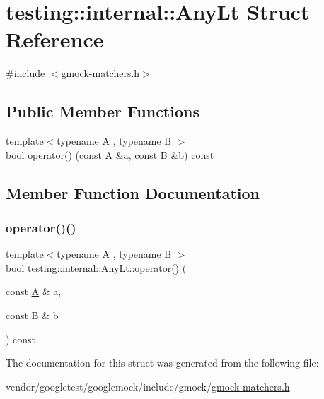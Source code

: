 \hypertarget{structtesting_1_1internal_1_1_any_lt}{}\section{testing\+:\+:internal\+:\+:Any\+Lt Struct Reference}
\label{structtesting_1_1internal_1_1_any_lt}


{\ttfamily \#include $<$gmock-\/matchers.\+h$>$}

\subsection*{Public Member Functions}
\begin{DoxyCompactItemize}
\item 
{\footnotesize template$<$typename A , typename B $>$ }\\bool \hyperlink{structtesting_1_1internal_1_1_any_lt_ac7be54cdf8fd18e12fda49d886eefb56}{operator()} (const \hyperlink{namespacetesting_a5e9134d655d2fc9323902348083282e7}{A} \&a, const B \&b) const
\end{DoxyCompactItemize}


\subsection{Member Function Documentation}
\mbox{\label{structtesting_1_1internal_1_1_any_lt_ac7be54cdf8fd18e12fda49d886eefb56}} 
\subsubsection{\texorpdfstring{operator()()}{operator()()}}
{\footnotesize\ttfamily template$<$typename A , typename B $>$ \\
bool testing\+::internal\+::\+Any\+Lt\+::operator() (\begin{DoxyParamCaption}\item[{const \hyperlink{namespacetesting_a5e9134d655d2fc9323902348083282e7}{A} \&}]{a,  }\item[{const B \&}]{b }\end{DoxyParamCaption}) const\hspace{0.3cm}{\ttfamily [inline]}}



The documentation for this struct was generated from the following file\+:\begin{DoxyCompactItemize}
\item 
vendor/googletest/googlemock/include/gmock/\hyperlink{gmock-matchers_8h}{gmock-\/matchers.\+h}\end{DoxyCompactItemize}
